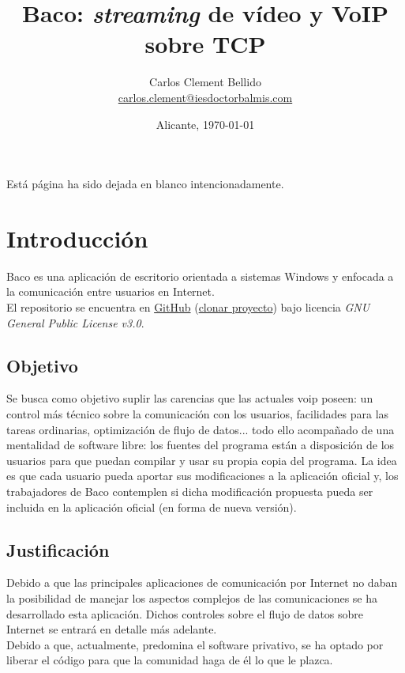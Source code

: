 \documentclass[12pt, a4paper]{book} %
\title{Baco: \selectlanguage{english}\textit{streaming}\selectlanguage{spanish} de vídeo y VoIP sobre TCP}
\author{Carlos Clement Bellido\\\href{mailto:carlos.clement@iesdoctorbalmis.com}{carlos.clement@iesdoctorbalmis.com}}
\date{Alicante, \today}
\makeatletter
\newcommand*{\blankpage}{%
	\vspace*{\fill}
	{\centering Está página ha sido dejada en blanco intencionadamente.\par}
	\vspace{\fill}}
\renewcommand*{\cleardoublepage}{\clearpage\if@twoside \ifodd\c@page\else
	\blankpage
	\thispagestyle{fancy}
	\newpage
	\if@twocolumn\hbox{}\newpage\fi\fi\fi}
\makeatother
\begin{document}
	
	\onehalfspacing %
	\setlength{\parskip}{\baselineskip/3} %
	\setlength{\parindent}{0pt} %
	
	\frontmatter
	\maketitle
	\cleardoublepage %
	\hypertarget{toc}{} %
	\tableofcontents
	\printglossary[type=\acronymtype,nonumberlist,title={Acrónimos}]
	\mainmatter
	
	\chapter{Introducción}
	Baco es una aplicación de escritorio orientada a sistemas Windows y enfocada a la comunicación entre usuarios en Internet.\\
	El repositorio se encuentra en \href{https://github.com/CarlosClementBellido/Baco}{GitHub} (\href{git-client://clone?repo=https\%3A\%2F\%2Fgithub.com\%2FCarlosClementBellido\%2FBaco}{clonar proyecto}) bajo licencia \textit{GNU General Public License v3.0}.
		\section{Objetivo} \label{sc:objetivo}
		Se busca como objetivo suplir las carencias que las actuales \acrshort{voip} poseen: un control más técnico sobre la comunicación con los usuarios, facilidades para las tareas ordinarias, optimización de flujo de datos... todo ello acompañado de una mentalidad de software libre: los fuentes del programa están a disposición de los usuarios para que puedan compilar y usar su propia copia del programa. La idea es que cada usuario pueda aportar sus modificaciones a la aplicación oficial y, los trabajadores de Baco contemplen si dicha modificación propuesta pueda ser incluida en la aplicación oficial (en forma de nueva versión). 
		\section{Justificación}
		Debido a que las principales aplicaciones de comunicación por Internet no daban la posibilidad de manejar los aspectos complejos de las comunicaciones se ha desarrollado esta aplicación. Dichos controles sobre el flujo de datos sobre Internet se entrará en detalle más adelante.\\
		Debido a que, actualmente, predomina el software privativo, se ha optado por liberar el código para que la comunidad haga de él lo que le plazca.
\end{document}
